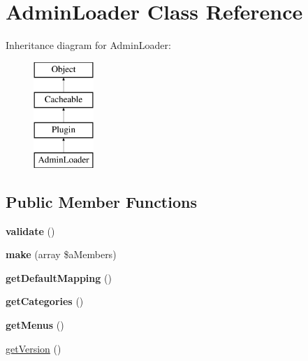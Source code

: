 \hypertarget{class_admin_loader}{\section{Admin\-Loader Class Reference}
\label{class_admin_loader}
}
Inheritance diagram for Admin\-Loader\-:\begin{figure}[H]
\begin{center}
\leavevmode
\includegraphics[height=4.000000cm]{class_admin_loader}
\end{center}
\end{figure}
\subsection*{Public Member Functions}
\begin{DoxyCompactItemize}
\item 
\hypertarget{class_admin_loader_a29356f685ab36bee184ca8662dda728e}{{\bfseries validate} ()}\label{class_admin_loader_a29356f685ab36bee184ca8662dda728e}

\item 
\hypertarget{class_admin_loader_a3b16bbcee8979950b89044e7ab205031}{{\bfseries make} (array \$a\-Members)}\label{class_admin_loader_a3b16bbcee8979950b89044e7ab205031}

\item 
\hypertarget{class_admin_loader_a2e894bc73d4dacc8ba6ca3aef10223aa}{{\bfseries get\-Default\-Mapping} ()}\label{class_admin_loader_a2e894bc73d4dacc8ba6ca3aef10223aa}

\item 
\hypertarget{class_admin_loader_a23cef4656b63e0043705d94cfb67900c}{{\bfseries get\-Categories} ()}\label{class_admin_loader_a23cef4656b63e0043705d94cfb67900c}

\item 
\hypertarget{class_admin_loader_a059dc9bb22cd867a33c632433adbcf41}{{\bfseries get\-Menus} ()}\label{class_admin_loader_a059dc9bb22cd867a33c632433adbcf41}

\item 
\hyperlink{class_admin_loader_ae8d97e1888dfd2172ab4997d117b71db}{get\-Version} ()
\end{DoxyCompactItemize}
